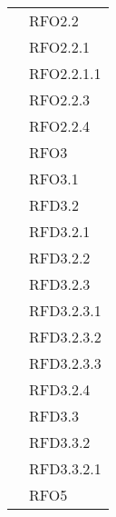 \begin{longtable}{|>{\centering}m{10cm}|m{3cm}<{\centering}|}
& RFO2.2\\
& RFO2.2.1\\
& RFO2.2.1.1\\
& RFO2.2.3\\
& RFO2.2.4\\
& RFO3\\
& RFO3.1\\
& RFD3.2\\
& RFD3.2.1\\
& RFD3.2.2\\
& RFD3.2.3\\
& RFD3.2.3.1\\
& RFD3.2.3.2\\
& RFD3.2.3.3\\
& RFD3.2.4\\
& RFD3.3\\
& RFD3.3.2\\
& RFD3.3.2.1\\
& RFO5\\ \hline


\end{longtable}
